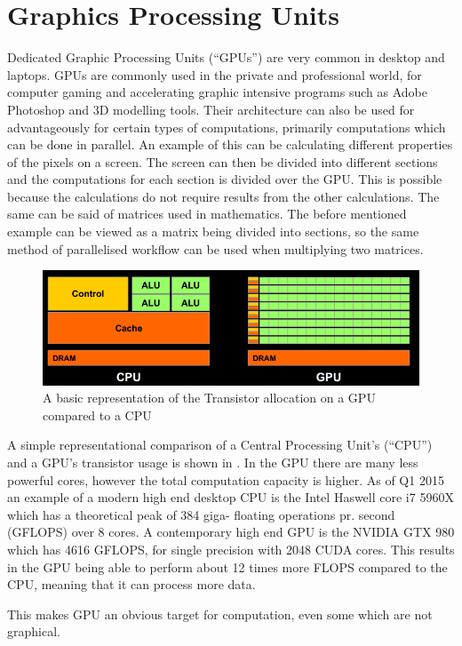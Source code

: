 \section{Graphics Processing Units}
\label{sec:GPU}
Dedicated Graphic Processing Units (``GPUs'') are very common in desktop and laptops. \citep{STEAMHW}
GPUs are commonly used in the private and professional world, for computer gaming and accelerating graphic intensive programs such as Adobe Photoshop and 3D modelling tools. \citep{NVIDIAADOBE}
Their architecture can also be used for advantageously for certain types of computations, primarily computations which can be done in parallel. 
An example of this can be calculating different properties of the pixels on a screen. 
The screen can then be divided into different sections and the computations for each section is divided over the GPU.
This is possible because the calculations do not require results from the other calculations.
The same can be said of matrices used in mathematics.
The before mentioned example can be viewed as a matrix being divided into sections, so the same method of parallelised workflow can be used when multiplying two matrices.

\begin{figure}[h!]
\centering
 \includegraphics[width=1\textwidth]{figures/GPUCPUimage.png} %
\caption{A basic representation of the Transistor allocation on a GPU compared to a CPU}\label{image:GPUCPUimage} %
\vspace{-15pt}
\end{figure}

A simple representational comparison of a Central Processing Unit's (``CPU'') and a GPU's transistor usage is shown in .
In the GPU there are many less powerful cores, however the total computation capacity is higher. 
As of Q1 2015 an example of a modern high end desktop CPU is the Intel Haswell core i7 5960X which has a theoretical peak of 384 giga- floating operations pr. second (GFLOPS) over 8 cores. \citep{puget}
A contemporary high end GPU is the NVIDIA GTX 980 which has 4616 GFLOPS, for single precision with 2048 CUDA cores. \citep{techpowerup,gtx980}
This results in the GPU being able to perform about 12 times more FLOPS compared to the CPU, meaning that it can process more data. 

This makes GPU an obvious target for computation, even some which are not graphical. %